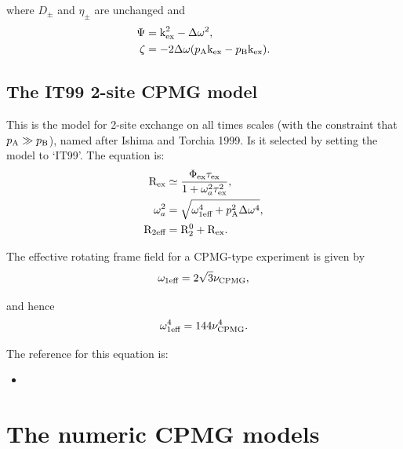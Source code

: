 where $D_\pm$ and $\eta_\pm$ are unchanged and
\begin{align}
    \Psi  &= \textrm{k}_\textrm{ex}^2 - \Delta\omega^2 , \\
    \zeta &= -2\Delta\omega (p_\textrm{A}\textrm{k}_\textrm{ex} - p_\textrm{B}\textrm{k}_\textrm{ex}) .
\end{align}




\subsection{The IT99 2-site CPMG model}
\label{sect: dispersion: IT99 model}

This is the model for 2-site exchange on all times scales (with the constraint that $p_\textrm{A} \gg p_\textrm{B}$), named after Ishima and Torchia 1999.  Is it selected by setting the model to `IT99'.  The equation is:
\begin{align}
    \mathrm{R}_\textrm{ex}       &\simeq \frac{\Phi_\textrm{ex}\tau_\textrm{ex}}{1 + \omega_a^2\tau_\textrm{ex}^2} , \\
    \omega_a^2 &= \sqrt{\omega_\textrm{1eff}^4 + p_\textrm{A}^2\Delta\omega^4} , \\
    \mathrm{R}_{2\textrm{eff}}   &= \mathrm{R}_2^0 + \mathrm{R}_\textrm{ex} .
\end{align}

The effective rotating frame field for a CPMG-type experiment is given by
\begin{equation}
    \omega_\textrm{1eff} = 2\sqrt{3}\nu_\textrm{CPMG} ,
\end{equation}

and hence
\begin{equation}
    \omega_\textrm{1eff}^4 = 144\nu_\textrm{CPMG}^4 .
\end{equation}

The reference for this equation is:
\begin{itemize}
\item {}
\end{itemize}




\section{The numeric CPMG models}
\label{sect: dispersion: numeric CPMG models}



